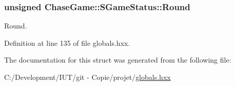 \hypertarget{struct_chase_game_1_1_s_game_status_afd8742d8a27af58077d4a9fe9f9b1c4f}{
\subsubsection[{Round}]{\setlength{\rightskip}{0pt plus 5cm}unsigned Chase\-Game\-::\-S\-Game\-Status\-::\-Round}}\label{struct_chase_game_1_1_s_game_status_afd8742d8a27af58077d4a9fe9f9b1c4f}


Round. 



Definition at line 135 of file globals.\-hxx.



The documentation for this struct was generated from the following file\-:\begin{DoxyCompactItemize}
\item 
C\-:/\-Development/\-I\-U\-T/git -\/ Copie/projet/\hyperlink{globals_8hxx}{globals.\-hxx}\end{DoxyCompactItemize}
